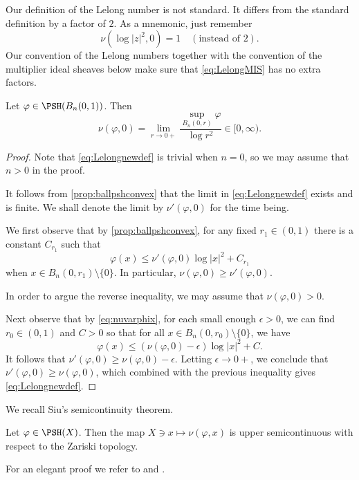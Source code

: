 \begin{remark}\label{rmk:Lelongconv}
Our definition of the Lelong number is not standard. It differs from the standard definition by a factor of $2$. As a mnemonic, just remember
\[
\nu\left(\log |z|^2,0\right)=1 \quad (\text{instead of } 2).
\]
Our convention of the Lelong numbers together with the convention of the multiplier ideal sheaves below make sure that \eqref{eq:LelongMIS} has no extra factors.
\end{remark}



\begin{proposition}\label{prop:Lelongreform}
    Let $\varphi\in \PSH(B_n(0,1))$. Then
    \begin{equation}\label{eq:Lelongnewdef}
    \nu(\varphi,0)=\lim_{r \to 0+} \frac{\sup_{B_n(0,r)}\varphi}{\log r^2}\in [0,\infty).
    \end{equation}
\end{proposition}
\begin{proof}
    Note that \eqref{eq:Lelongnewdef} is trivial when $n=0$, so we may assume that $n>0$ in the proof.

    It follows from \cref{prop:ballpshconvex} that the limit in \eqref{eq:Lelongnewdef} exists and is finite. We shall denote the limit by $\nu'(\varphi,0)$ for the time being.

    We first observe that by \cref{prop:ballpshconvex}, for any fixed $r_1\in (0,1)$ there is a constant $C_{r_1}$ such that
    \begin{equation}\label{eq:varphixlocalupperbd}
    \varphi(x)\leq  \nu'(\varphi,0)\log |x|^2+C_{r_1}
    \end{equation}
    when $x\in B_n(0,r_1)\setminus \{0\}$. In particular, $\nu(\varphi,0)\geq \nu'(\varphi,0)$.

    In order to argue the reverse inequality, we may assume that $\nu(\varphi,0)>0$.

    Next observe that by \eqref{eq:nuvarphix}, for each small enough $\epsilon>0$, we can find $r_0\in (0,1)$ and $C>0$ so that for all $x\in B_n(0,r_0)\setminus \{0\}$, we have
    \[
    \varphi(x)\leq (\nu(\varphi,0)-\epsilon)\log |x|^2+C.
    \]
    It follows that $\nu'(\varphi,0)\geq \nu(\varphi,0)-\epsilon$. Letting $\epsilon\to 0+$, we conclude that $\nu'(\varphi,0)\geq \nu(\varphi,0)$, which combined with the previous inequality gives \eqref{eq:Lelongnewdef}.
\end{proof}

We recall Siu's semicontinuity theorem.
\begin{theorem}[Siu]\label{thm:Siusemi}
    Let $\varphi\in \PSH(X)$. Then the map $X\ni x\mapsto \nu(\varphi,x)$ is upper semicontinuous with respect to the Zariski topology.
\end{theorem}
For an elegant proof we refer to \cite[Theorem~2.10]{Dem12} and \cite[Theorem~12.3.4]{FPT}.

